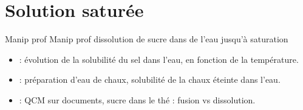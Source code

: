 \documentclass[12pt,a4paper]{article}
\begin{document}
\section{Solution saturée}

\begin{myact}{Manip prof}
	Manip prof dissolution de sucre dans de l'eau jusqu'à saturation
\end{myact}



\begin{myexos}
	\begin{itemize}
		\item {} : évolution de la solubilité du sel dans l'eau, en fonction de la température.
		\item {} : préparation d'eau de chaux, solubilité de la chaux éteinte dans l'eau.
		\item {} : QCM sur documents, sucre dans le thé : fusion vs dissolution.		
	\end{itemize}
\end{myexos}
\end{document}
